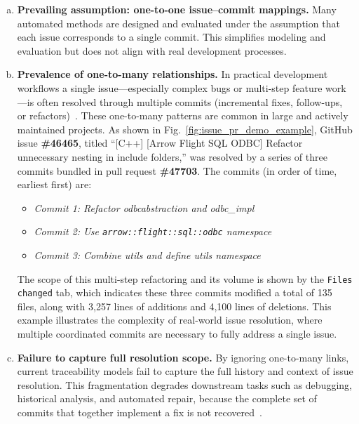 \begin{enumerate}[a)]
	\item \textbf{Prevailing assumption: one-to-one issue--commit mappings.} Many automated methods are designed and evaluated under the assumption that each issue corresponds to a single commit. This simplifies modeling and evaluation but does not align with real development processes.
	
	\item \textbf{Prevalence of one-to-many relationships.} In practical development workflows a single issue—especially complex bugs or multi-step feature work—is often resolved through multiple commits (incremental fixes, follow-ups, or refactors)~\cite{r7,r17}. These one-to-many patterns are common in large and actively maintained projects. As shown in Fig.~\ref{fig:issue_pr_demo_example}, GitHub issue \textbf{\#46465}, titled ``[C++] [Arrow Flight SQL ODBC] Refactor unnecessary nesting in include folders,'' was resolved by a series of three commits bundled in pull request \textbf{\#47703}. The commits (in order of time, earliest first) are:
    \begin{itemize}
        \setlength\itemsep{0pt}
        \setlength\parskip{0pt}
        \setlength\topsep{0pt}
        \item \textit{Commit 1: Refactor odbcabstraction and odbc\_impl}
        \item \textit{Commit 2: Use \texttt{arrow::flight::sql::odbc} namespace}
        \item \textit{Commit 3: Combine utils and define utils namespace}
        \end{itemize}

    The scope of this multi-step refactoring and its volume is shown by the \texttt{Files changed} tab, which indicates these three commits modified a total of 135 files, along with 3,257 lines of additions and 4,100 lines of deletions. This example illustrates the complexity of real-world issue resolution, where multiple coordinated commits are necessary to fully address a single issue.

	\item \textbf{Failure to capture full resolution scope.} By ignoring one-to-many links, current traceability models fail to capture the full history and context of issue resolution. This fragmentation degrades downstream tasks such as debugging, historical analysis, and automated repair, because the complete set of commits that together implement a fix is not recovered~\cite{r7}.
\end{enumerate}


